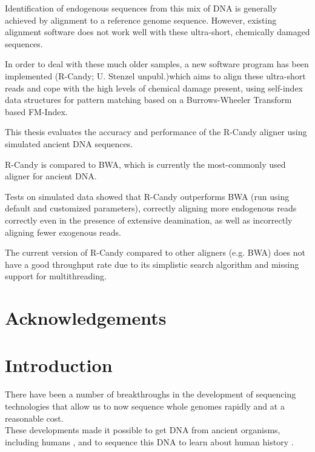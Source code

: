 \documentclass[11pt,a4paper]{report}
\begin{document}
Identification of endogenous sequences from this mix of DNA is generally achieved by
alignment to a reference genome sequence. 
However, existing alignment software does not work well with these ultra-short, 
chemically damaged sequences.

In order to deal with these much older samples, a new software program has been implemented
(R-Candy; U. Stenzel unpubl.)which aims to align these ultra-short reads and cope with the high 
levels of chemical damage present, using self-index data structures for pattern matching
based on a Burrows-Wheeler Transform based FM-Index.


This thesis evaluates the accuracy and performance of the R-Candy aligner using 
simulated ancient DNA sequences. 

R-Candy is compared to BWA, which is currently the most-commonly used aligner for ancient DNA.

Tests on simulated data showed that R-Candy outperforms BWA (run using default 
and customized parameters), correctly aligning more endogenous reads correctly even
in the presence of extensive deamination, as well as incorrectly aligning fewer
exogenous reads.

The current version of R-Candy compared to other aligners (e.g. BWA) does not have a good 
throughput rate due to its simplistic search algorithm and missing
support for multithreading.

\newpage\null\thispagestyle{empty}\newpage
\section*{Acknowledgements}
\newpage\null\thispagestyle{empty}\newpage

\tableofcontents
\newpage
\listoftables
\newpage
\listoffigures
\newpage




\section{Introduction} \label{Introduction}


There have been a number of breakthroughs in the development of sequencing 
technologies that allow us to now sequence whole genomes rapidly and at a 
reasonable cost\cite{NGS}\cite{454}\cite{NGS2}.
\\
These developments made it possible to get DNA from ancient organisms, 
including humans \cite{AncientDNA}\cite{fish2human}, and to sequence 
this DNA to learn about human history\cite{impactOFhg}\cite{ourGenome}
\cite{SNP}.
\end{document}
